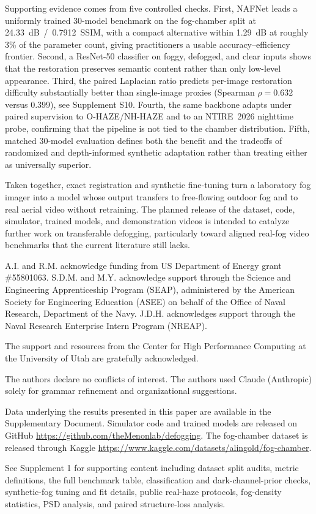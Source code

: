 \documentclass{optica-article}
\begin{document}
Supporting evidence comes from five controlled checks. First, NAFNet
leads a uniformly trained 30-model benchmark on the fog-chamber split
at 24.33~dB~/~0.7912~SSIM, with a compact alternative within 1.29~dB
at roughly 3\% of the parameter count, giving practitioners a usable
accuracy--efficiency frontier. Second, a ResNet-50 classifier on
foggy, defogged, and clear inputs shows that the restoration
preserves semantic content rather than only low-level appearance.
Third, the paired Laplacian ratio predicts per-image restoration
difficulty substantially better than single-image proxies
(Spearman $\rho = 0.632$ versus $0.399$), see Supplement S10. Fourth, the same backbone adapts under paired supervision to O-HAZE/NH-HAZE and to an NTIRE~2026
nighttime probe, confirming that the pipeline is not tied to the
chamber distribution. Fifth, matched 30-model evaluation defines both the
benefit and the tradeoffs of randomized and depth-informed synthetic
adaptation rather than treating either as universally superior.

Taken together, exact registration and synthetic fine-tuning turn a laboratory fog imager into a model whose output
transfers to free-flowing outdoor fog and to real aerial video
without retraining. The planned release of the dataset, code,
simulator, trained models, and demonstration videos is intended to catalyze further
work on transferable defogging, particularly toward aligned real-fog
video benchmarks that the current literature still lacks.

\begin{backmatter}
 A.I. and R.M. acknowledge funding from US Department of Energy grant \#55801063. S.D.M. and M.Y. acknowledge support through the Science and Engineering Apprenticeship Program (SEAP), administered by the American Society for Engineering Education (ASEE) on behalf of the Office of Naval Research, Department of the Navy. J.D.H. acknowledges support through the Naval Research Enterprise Intern Program (NREAP). 

 The support and resources from the Center for High Performance Computing at the University of Utah are gratefully acknowledged.

 The authors declare no conflicts of interest. The authors used Claude (Anthropic) solely for grammar refinement and organizational suggestions. 

 Data underlying the results presented in this paper are available in the Supplementary Document. Simulator code and trained models are released on GitHub \url{https://github.com/theMenonlab/defogging}. The fog-chamber dataset is released through Kaggle \url{https://www.kaggle.com/datasets/alingold/fog-chamber}.

See Supplement 1 for supporting content including dataset split audits, metric definitions, the full benchmark table, classification and dark-channel-prior checks, synthetic-fog tuning and fit details, public real-haze protocols, fog-density statistics, PSD analysis, and paired structure-loss analysis.

\end{backmatter}


\end{document}
